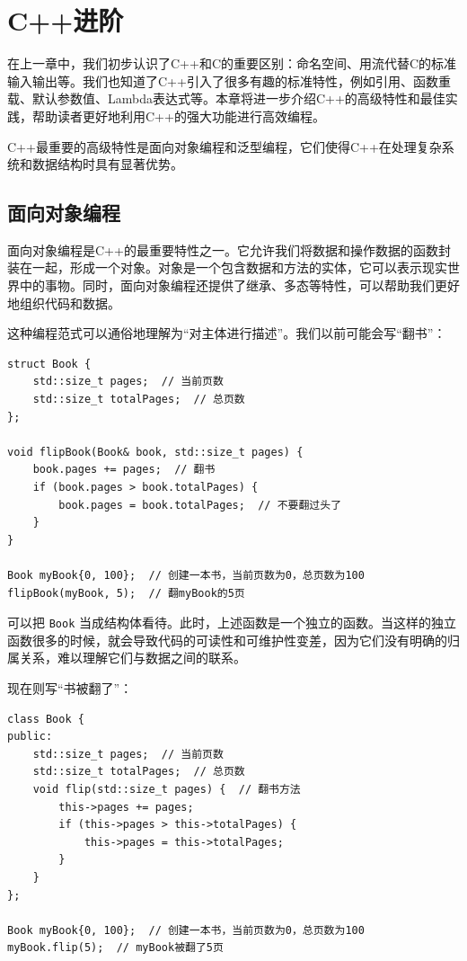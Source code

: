 \chapter{C++进阶}\label{chap:cpp-2}

在上一章中，我们初步认识了C++和C的重要区别：命名空间、用流代替C的标准输入输出等。我们也知道了C++引入了很多有趣的标准特性，例如引用、函数重载、默认参数值、Lambda表达式等。本章将进一步介绍C++的高级特性和最佳实践，帮助读者更好地利用C++的强大功能进行高效编程。

C++最重要的高级特性是面向对象编程和泛型编程，它们使得C++在处理复杂系统和数据结构时具有显著优势。

\section{面向对象编程}

面向对象编程是C++的最重要特性之一。它允许我们将数据和操作数据的函数封装在一起，形成一个对象。对象是一个包含数据和方法的实体，它可以表示现实世界中的事物。同时，面向对象编程还提供了继承、多态等特性，可以帮助我们更好地组织代码和数据。

这种编程范式可以通俗地理解为“对主体进行描述”。我们以前可能会写“翻书”：
\begin{verbatim}
struct Book {
    std::size_t pages;  // 当前页数
    std::size_t totalPages;  // 总页数
};

void flipBook(Book& book, std::size_t pages) {
    book.pages += pages;  // 翻书
    if (book.pages > book.totalPages) {
        book.pages = book.totalPages;  // 不要翻过头了
    }
}

Book myBook{0, 100};  // 创建一本书，当前页数为0，总页数为100
flipBook(myBook, 5);  // 翻myBook的5页
\end{verbatim}
可以把 \verb|Book| 当成结构体看待。此时，上述函数是一个独立的函数。当这样的独立函数很多的时候，就会导致代码的可读性和可维护性变差，因为它们没有明确的归属关系，难以理解它们与数据之间的联系。

现在则写“书被翻了”：
\begin{verbatim}
class Book {
public:
    std::size_t pages;  // 当前页数
    std::size_t totalPages;  // 总页数
    void flip(std::size_t pages) {  // 翻书方法
        this->pages += pages; 
        if (this->pages > this->totalPages) {
            this->pages = this->totalPages; 
        }
    }
};

Book myBook{0, 100};  // 创建一本书，当前页数为0，总页数为100
myBook.flip(5);  // myBook被翻了5页
\end{verbatim}


